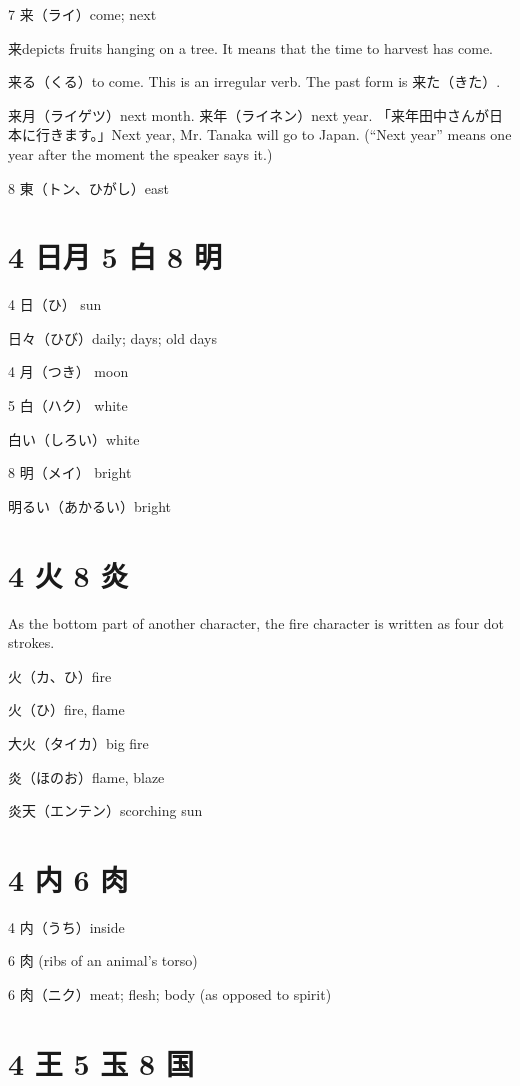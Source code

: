 7 来（ライ）come; next

来depicts fruits hanging on a tree.
It means that the time to harvest has come.

来る（くる）to come. This is an irregular verb. The past form is 来た（きた）.

来月（ライゲツ）next month.
来年（ライネン）next year.
「来年田中さんが日本に行きます。」Next year, Mr. Tanaka will go to Japan.
(``Next year'' means one year after the moment the speaker says it.)

8 東（トン、ひがし）east

\section{4 日月 5 白 8 明}

4 日（ひ） sun

日々（ひび）daily; days; old days

4 月（つき） moon

5 白（ハク） white

白い（しろい）white

8 明（メイ） bright

明るい（あかるい）bright

\section{4 火 8 炎}

As the bottom part of another character,
the fire character is written as four dot strokes.

火（カ、ひ）fire

火（ひ）fire, flame

大火（タイカ）big fire

炎（ほのお）flame, blaze

炎天（エンテン）scorching sun

\section{4 内 6 肉}

4 内（うち）inside

6 肉 (ribs of an animal's torso)

6 肉（ニク）meat; flesh; body (as opposed to spirit)

\section{4 王 5 玉 8 国}

